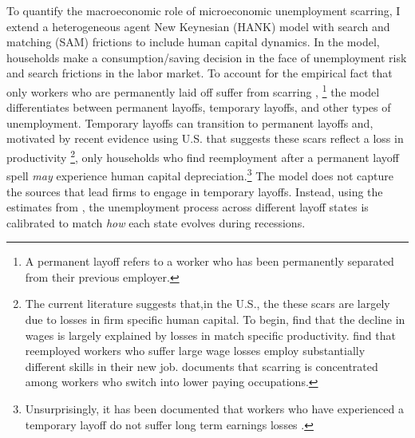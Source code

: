 







To quantify the macroeconomic role of microeconomic unemployment scarring, I extend a heterogeneous agent New Keynesian (HANK) model with search and matching (SAM) frictions to include human capital dynamics. In the model, households make a consumption/saving decision in the face of unemployment risk and search frictions in the labor market. To account for the empirical fact that only workers who are permanently laid off suffer from scarring \citep{ Fujita2016}, \footnote{A permanent layoff refers to a worker who has been permanently separated from their previous employer.} the model differentiates between permanent layoffs, temporary layoffs, and other types of unemployment. Temporary layoffs can transition to permanent layoffs and, motivated by recent evidence using U.S. that suggests these scars reflect a loss in productivity \footnote{ The current literature suggests that,in the U.S., the these scars are largely due to losses in firm specific human capital. To begin, \cite{Lachowska2020} find that the decline in wages is largely explained by losses in match specific productivity. \cite{Poletaev2008} find that reemployed workers who suffer large wage losses employ substantially different skills in their new job. \cite{Huckfeldt2022} documents that scarring is concentrated among workers who switch into lower paying occupations.}, only households who find reemployment after a permanent layoff spell \textit{may} experience human capital depreciation.\footnote{Unsurprisingly, it has been documented that workers who have experienced a temporary layoff do not suffer long term earnings losses \citep{Fujita2016}.} The model does not capture the sources that lead firms to engage in temporary layoffs. Instead, using the estimates from \cite{Gertler2022}, the unemployment process across different layoff states is calibrated to match \textit{how} each state evolves during recessions.%

